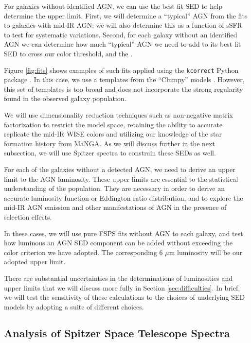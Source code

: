\documentclass[12pt, preprint]{hacked-aastex}
\begin{document}
For galaxies without identified AGN, we can use the best
fit SED to help determine the upper limit. First, we will 
determine a ``typical'' AGN from the fits to galaxies with
mid-IR AGN; we will also determine this as a function of 
sSFR to test for systematic variations. Second, for each 
galaxy without an identified AGN we can determine how 
much ``typical'' AGN we need to add to its best fit
SED to cross our 
color threshold, and the .




Figure \ref{fig:fits} shows examples of such fits applied using the
{\tt kcorrect} Python package \cite{blanton07a}. In this case, we use  
a 
templates from the ``Clumpy'' models \cite{nenkova08a}. However, this set
of templates is too broad and does not incorporate the strong regularity 
found in the observed galaxy population. 

We will use dimensionality reduction techniques such as non-negative 
matrix factorization to restrict the model space, retaining the ability
to accurate replicate the mid-IR WISE colors and utilizing our knowledge
of the star formation history from MaNGA.
As we will discuss further in the next subsection, we will use Spitzer spectra 
to constrain these SEDs as well.

For each of the galaxies without a detected AGN, we need to derive an
upper limit to the AGN luminosity. These upper limits are essential to 
the statistical understanding of the population. They are necessary in 
order to derive an accurate luminosity function or Eddington ratio
distribution, and to explore the mid-IR AGN emission and other manifestations 
of AGN in the presence of selection effects.

In these cases, we will use pure FSPS fits without AGN to each galaxy, and
test how luminous an AGN SED component can be added without exceeding the 
color criterion we have adopted. The corresponding 6 $\mu$m luminosity 
will be our adopted upper limit.

There are substantial uncertainties in the determinations of luminosities
and upper limits that we will discuss more fully in  Section 
\ref{sec:difficulties}. In brief, we will test the sensitivity 
of these calculations to the choices of underlying SED models by adopting 
a suite of different choices. 


\subsection{Analysis of Spitzer Space Telescope Spectra}
\label{sec:spitzer}
\end{document}
